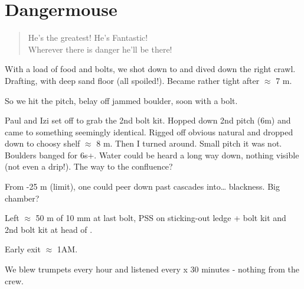 \section{Dangermouse}


\begin{verse}
\note He's the greatest! He's Fantastic!\\
        Wherever there is danger he'll be there! \enote
\end{verse}



With a load of food and bolts, we shot down to  and dived down the right crawl. Drafting, with deep sand floor (all spoiled!). Became rather tight after $\approx$ 7 m.

So we hit the pitch, belay off jammed boulder, soon with a bolt.

Paul and Izi set off to grab the 2nd bolt kit. Hopped down 2nd pitch (6m) and came to something seemingly identical. Rigged off obvious natural and dropped down to choosy shelf $\approx$ 8 m. Then I turned around. Small pitch it was not. Boulders banged for 6s+. Water could be heard a long way down, nothing visible (not even a drip!). The way
to the  confluence?

From -25 m (limit), one could peer down past cascades into\ldots{} blackness. Big chamber?

Left $\approx$ 50 m of 10 mm at last bolt, PSS on sticking-out ledge + bolt kit and 2nd bolt kit at head of .

Early exit $\approx$ 1AM.

We blew trumpets every hour and listened every x 30 minutes - nothing from the  crew.



